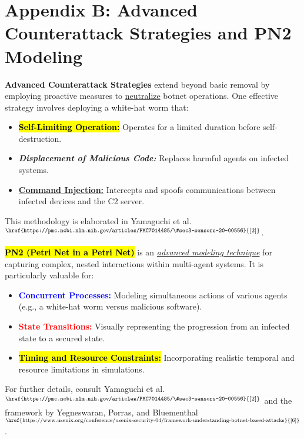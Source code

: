 \documentclass{article}
\begin{document}
\section*{Appendix B: Advanced Counterattack Strategies and PN2 Modeling}
\noindent \textbf{Advanced Counterattack Strategies} extend beyond basic removal by employing proactive measures to \underline{neutralize} botnet operations. One effective strategy involves deploying a white-hat worm that:
\begin{itemize}
    \item \textbf{\hl{Self-Limiting Operation:}} Operates for a limited duration before self-destruction.
    \item \textbf{\textit{Displacement of Malicious Code:}} Replaces harmful agents on infected systems.
    \item \textbf{\underline{Command Injection:}} Intercepts and spoofs communications between infected devices and the C2 server.
\end{itemize}
This methodology is elaborated in Yamaguchi et al.$^{\text{\href{https://pmc.ncbi.nlm.nih.gov/articles/PMC7014485/\#sec3-sensors-20-00556}{[2]}}}$.

\vspace{3mm}
\noindent \textbf{\hl{PN2 (Petri Net in a Petri Net)}} is an \textit{\underline{advanced modeling technique}} for capturing complex, nested interactions within multi-agent systems. It is particularly valuable for:
\begin{itemize}
    \item \textbf{\textcolor{blue}{Concurrent Processes:}} Modeling simultaneous actions of various agents (e.g., a white-hat worm versus malicious software).
    \item \textbf{\textcolor{red}{State Transitions:}} Visually representing the progression from an infected state to a secured state.
    \item \textbf{\hl{Timing and Resource Constraints:}} Incorporating realistic temporal and resource limitations in simulations.
\end{itemize}
For further details, consult Yamaguchi et al.$^{\text{\href{https://pmc.ncbi.nlm.nih.gov/articles/PMC7014485/\#sec3-sensors-20-00556}{[2]}}}$ and the framework by Yegneswaran, Porras, and Bluementhal$^{\text{\href{https://www.usenix.org/conference/usenix-security-04/framework-understanding-botnet-based-attacks}{[6]}}}$.
\end{document}
